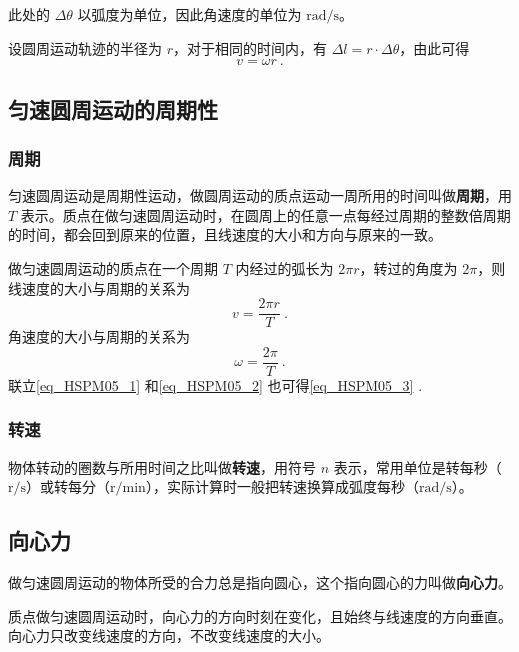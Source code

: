 此处的 $\Delta \theta$ 以弧度为单位，因此角速度的单位为 $\mathrm{rad/s}$。

设圆周运动轨迹的半径为 $r$，对于相同的时间内，有 $\Delta l=r \cdot \Delta \theta$，由此可得
\begin{equation}\label{eq_HSPM05_3}
v=\omega r~.
\end{equation}

\subsection{匀速圆周运动的周期性}

\subsubsection{周期}

匀速圆周运动是周期性运动，做圆周运动的质点运动一周所用的时间叫做\textbf{周期}，用 $T$ 表示。质点在做匀速圆周运动时，在圆周上的任意一点每经过周期的整数倍周期的时间，都会回到原来的位置，且线速度的大小和方向与原来的一致。

做匀速圆周运动的质点在一个周期 $T$ 内经过的弧长为 $2\pi r$，转过的角度为 $2\pi$，则线速度的大小与周期的关系为
\begin{equation}\label{eq_HSPM05_1}
v=\frac{2\pi r}{T}~.
\end{equation}
角速度的大小与周期的关系为
\begin{equation}\label{eq_HSPM05_2}
\omega = \frac{2\pi}{T}~.
\end{equation}
联立\autoref{eq_HSPM05_1} 和\autoref{eq_HSPM05_2} 也可得\autoref{eq_HSPM05_3} .

\subsubsection{转速}

物体转动的圈数与所用时间之比叫做\textbf{转速}，用符号 $n$ 表示，常用单位是转每秒（$\mathrm{r/s}$）或转每分（$\mathrm{r/min}$），实际计算时一般把转速换算成弧度每秒（$\mathrm{rad/s}$）。

\subsection{向心力}

做匀速圆周运动的物体所受的合力总是指向圆心，这个指向圆心的力叫做\textbf{向心力}。

质点做匀速圆周运动时，向心力的方向时刻在变化，且始终与线速度的方向垂直。向心力只改变线速度的方向，不改变线速度的大小。

